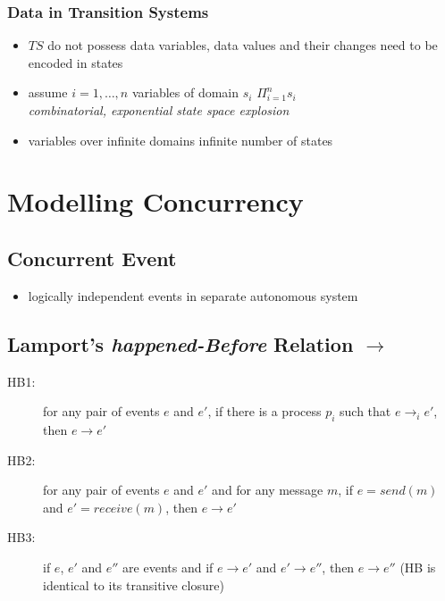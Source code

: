 \documentclass[a4paper, 10pt]{article}
\begin{document}
\subsubsection*{Data in Transition Systems}
\begin{itemize}
    \item $TS$ do not possess data variables, data values and their changes need to be encoded in states
    \item assume $i=1,\dots,n$ variables of domain $s_i$ \follows $\Pi^n_{i=1}s_i$ \\
    \emph{combinatorial, exponential state space explosion}
    \item variables over infinite domains \follows infinite number of states
\end{itemize}

\section*{Modelling Concurrency}
\subsection*{Concurrent Event}
\begin{itemize}
    \item logically independent events in separate autonomous system
\end{itemize}

\subsection*{Lamport's \emph{happened-Before} Relation $\to$}
\begin{shaded}
    \begin{description}
        \item[HB1:] for any pair of events $e$ and $e'$, if there is a process $p_i$ such that $e \to_i e'$, then $e \to e'$
        \item[HB2:] for any pair of events $e$ and $e'$ and for any message $m$, if $e = send(m)$ and $e' = receive(m)$, then $e \to e'$
        \item[HB3:] if $e$, $e'$ and $e''$ are events and if $e \to e'$ and $e' \to e''$, then $e \to e''$ (HB is identical to its transitive closure)
    \end{description}
\end{shaded}

\begin{center}
\scalebox{1}{}
\end{center}
\end{document}
